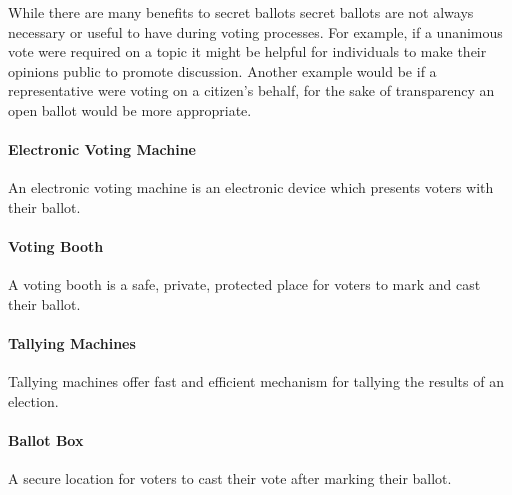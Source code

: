 While there are many benefits to secret ballots secret ballots are not always
necessary or useful to have during voting processes. For example, if a unanimous
vote were required on a topic it might be helpful for individuals to make their
opinions public to promote discussion. Another example would be if a
representative were voting on a citizen's behalf, for the sake of transparency
an open ballot would be more appropriate.

\paragraph{Electronic Voting Machine}
An electronic voting machine is an electronic device which presents voters with
their ballot.

\paragraph{Voting Booth}
A voting booth is a safe, private, protected place for voters to mark and cast
their ballot.

\paragraph{Tallying Machines}
Tallying machines offer fast and efficient mechanism for tallying the results of
an election.

\paragraph{Ballot Box}
A secure location for voters to cast their vote after marking their ballot.

%

